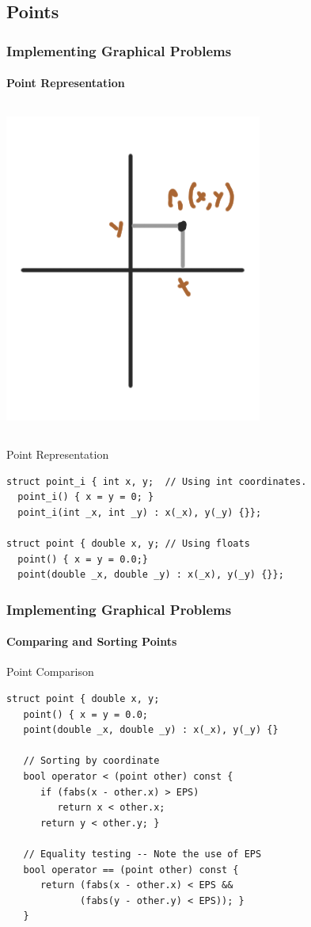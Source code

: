 \subsection{Points}
\begin{frame}[fragile]
  \frametitle{Implementing Graphical Problems}
  \framesubtitle{Point Representation}

  {\smaller
    \begin{columns}
      \includegraphics[width=.65\textwidth]{../img/geom2}
    \end{columns}

    \begin{exampleblock}{Point Representation}
\begin{verbatim}
struct point_i { int x, y;  // Using int coordinates.
  point_i() { x = y = 0; }
  point_i(int _x, int _y) : x(_x), y(_y) {}};

struct point { double x, y; // Using floats
  point() { x = y = 0.0;}
  point(double _x, double _y) : x(_x), y(_y) {}};
\end{verbatim}
    \end{exampleblock}
  }
\end{frame}

\begin{frame}[fragile]
  \frametitle{Implementing Graphical Problems}
  \framesubtitle{Comparing and Sorting Points}

  {\smaller

    \begin{exampleblock}{Point Comparison}
\begin{verbatim}
struct point { double x, y;
   point() { x = y = 0.0;
   point(double _x, double _y) : x(_x), y(_y) {}

   // Sorting by coordinate
   bool operator < (point other) const {
      if (fabs(x - other.x) > EPS)
         return x < other.x;
      return y < other.y; }

   // Equality testing -- Note the use of EPS
   bool operator == (point other) const {
      return (fabs(x - other.x) < EPS &&
             (fabs(y - other.y) < EPS)); }
   }
\end{verbatim}
    \end{exampleblock}
  }
\end{frame}

